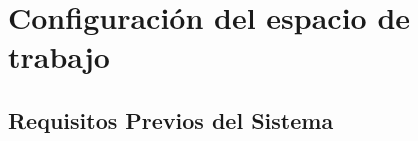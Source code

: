 \documentclass[
10pt, %
a4paper, %
oneside, %
headinclude,footinclude, %
BCOR5mm, %
]{scrartcl}
\begin{document}
\setcounter{tocdepth}{3} %

\tableofcontents %




\newpage





\newpage %


\section{Configuración del espacio de trabajo}

\subsection{Requisitos Previos del Sistema}
\end{document}
